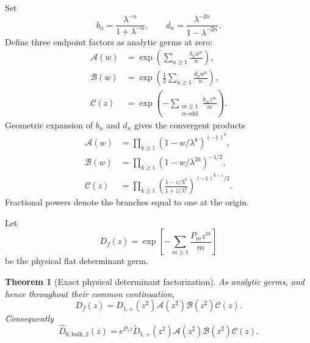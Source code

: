 \documentclass[11pt]{article}
\newtheorem{theorem}{Theorem}[section]
\theoremstyle{definition}
\theoremstyle{remark}
\newcommand{\cA}{\mathcal A}
\newcommand{\cB}{\mathcal B}
\newcommand{\cC}{\mathcal C}
\begin{document}
Set
\begin{equation}\label{eq:b-d-definitions}
 b_n=\frac{\lambda^{-n}}{1+\lambda^{-n}},
 \qquad
 d_n=\frac{\lambda^{-2n}}{1-\lambda^{-2n}}.
\end{equation}
Define three endpoint factors as analytic germs at zero:
\begin{align}
 \cA(w)
 &=\exp\left(\sum_{n\ge1}\frac{b_nw^n}{n}\right),
 \label{eq:A-definition}\\
 \cB(w)
 &=\exp\left(\frac12\sum_{n\ge1}\frac{d_nw^n}{n}\right),
 \label{eq:B-definition}\\
 \cC(z)
 &=\exp\left(-\sum_{\substack{m\ge1\\m\ \mathrm{odd}}}
 \frac{b_mz^m}{m}\right).
 \label{eq:C-definition}
\end{align}
Geometric expansion of $b_n$ and $d_n$ gives the convergent products
\begin{align}
 \cA(w)
 &=\prod_{k\ge1}(1-w/\lambda^k)^{(-1)^k},
 \label{eq:A-product}\\
 \cB(w)
 &=\prod_{k\ge1}(1-w/\lambda^{2k})^{-1/2},
 \label{eq:B-product}\\
 \cC(z)
 &=\prod_{k\ge1}
 \left(\frac{1-z/\lambda^k}{1+z/\lambda^k}\right)^{(-1)^{k-1}/2}.
 \label{eq:C-product}
\end{align}
Fractional powers denote the branches equal to one at the origin.

Let
\begin{equation}\label{eq:raw-flat-determinant}
 D_f(z)=\exp\left[-\sum_{m\ge1}\frac{P_mz^m}{m}\right]
\end{equation}
be the physical flat determinant germ.

\begin{theorem}[Exact physical determinant factorization]
\label{thm:physical-factorization}
As analytic germs, and hence throughout their common continuation,
\begin{equation}\label{eq:raw-factorization}
 \boxed{
 D_f(z)
 =D_{1,+}(z^2)\cA(z^2)\cB(z^2)\cC(z).}
\end{equation}
Consequently
\begin{equation}\label{eq:bulk-full-factorization}
 \boxed{
 \widehat D_{0,\mathrm{bulk},2}(z)
 =e^{P_1z}\widetilde D_{1,+}(z^2)
 \cA(z^2)\cB(z^2)\cC(z).}
\end{equation}
\end{theorem}
\end{document}
